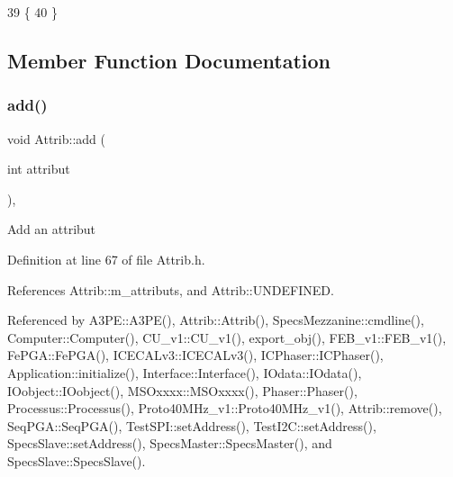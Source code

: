 \begin{DoxyCode}
39              \{ 
40 \} 
\end{DoxyCode}


\subsection{Member Function Documentation}
\mbox{\label{classAttrib_a235f773af19c900264a190b00a3b4ad7}} 
\subsubsection{\texorpdfstring{add()}{add()}\hspace{0.1cm}{\footnotesize\ttfamily [1/2]}}
{\footnotesize\ttfamily void Attrib\+::add (\begin{DoxyParamCaption}\item[{int}]{attribut }\end{DoxyParamCaption})\hspace{0.3cm}{\ttfamily [inline]}, {\ttfamily [inherited]}}

Add an attribut 

Definition at line 67 of file Attrib.\+h.



References Attrib\+::m\+\_\+attributs, and Attrib\+::\+U\+N\+D\+E\+F\+I\+N\+ED.



Referenced by A3\+P\+E\+::\+A3\+P\+E(), Attrib\+::\+Attrib(), Specs\+Mezzanine\+::cmdline(), Computer\+::\+Computer(), C\+U\+\_\+v1\+::\+C\+U\+\_\+v1(), export\+\_\+obj(), F\+E\+B\+\_\+v1\+::\+F\+E\+B\+\_\+v1(), Fe\+P\+G\+A\+::\+Fe\+P\+G\+A(), I\+C\+E\+C\+A\+Lv3\+::\+I\+C\+E\+C\+A\+Lv3(), I\+C\+Phaser\+::\+I\+C\+Phaser(), Application\+::initialize(), Interface\+::\+Interface(), I\+Odata\+::\+I\+Odata(), I\+Oobject\+::\+I\+Oobject(), M\+S\+Oxxxx\+::\+M\+S\+Oxxxx(), Phaser\+::\+Phaser(), Processus\+::\+Processus(), Proto40\+M\+Hz\+\_\+v1\+::\+Proto40\+M\+Hz\+\_\+v1(), Attrib\+::remove(), Seq\+P\+G\+A\+::\+Seq\+P\+G\+A(), Test\+S\+P\+I\+::set\+Address(), Test\+I2\+C\+::set\+Address(), Specs\+Slave\+::set\+Address(), Specs\+Master\+::\+Specs\+Master(), and Specs\+Slave\+::\+Specs\+Slave().


